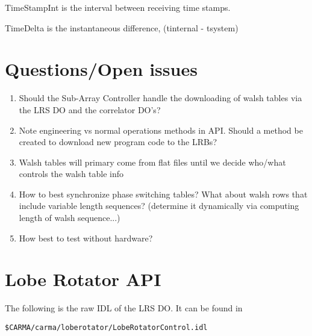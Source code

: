 \documentclass[preprint]{aastex}
\begin{document}
TimeStampInt is the interval between receiving time stamps.

TimeDelta is the instantaneous difference, (t{internal} - t{system})

\section{Questions/Open issues}

\begin{enumerate}
\item Should the Sub-Array Controller handle the downloading of walsh
tables via the LRS DO and the correlator DO's?

\item Note engineering vs normal operations methods in API.  Should
a method be created to download new program code to the LRBs?

\item Walsh tables will primary come from flat files until
we decide who/what controls the walsh table info

\item How to best synchronize phase switching tables?  What about
walsh rows that include variable length sequences? (determine
it dynamically via computing length of walsh sequence...)

\item How best to test without hardware?

\end{enumerate}

\clearpage

\section{Lobe Rotator API}

The following is the raw IDL of the LRS DO.  It can be found in
\begin{verbatim}
$CARMA/carma/loberotator/LobeRotatorControl.idl
\end{verbatim}


\end{document}
